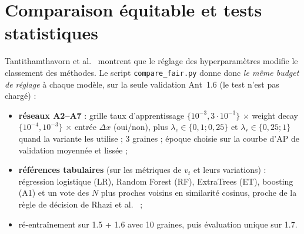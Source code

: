 \documentclass[11pt,a4paper,openany]{report}
\newcommand{\code}[1]{\texttt{\small #1}}
\begin{document}
\section{Comparaison équitable et tests statistiques}
\label{sec:fair}
Tantithamthavorn et al.~\cite{tantithamthavorn2016} montrent que le réglage des hyperparamètres modifie le classement
des méthodes. Le script \code{compare\_fair.py} donne donc \emph{le même budget de réglage} à chaque modèle, sur la
seule validation Ant~1.6 (le test n'est pas chargé) :
\begin{itemize}
  \item \textbf{réseaux A2--A7} : grille taux d'apprentissage $\{10^{-3},3\cdot10^{-3}\}$ $\times$ weight decay
        $\{10^{-4},10^{-3}\}$ $\times$ entrée $\Delta x$ (oui/non), plus $\lambda_c\in\{0{,}1;0{,}25\}$ et
        $\lambda_r\in\{0{,}25;1\}$ quand la variante les utilise ; 3 graines ; époque choisie sur la courbe d'AP de
        validation moyennée et lissée ;
  \item \textbf{références tabulaires} (sur les métriques de $v_t$ et leurs variations) : régression logistique (LR),
        Random Forest (RF), ExtraTrees (ET), boosting (A1) et un vote des $N$ plus proches voisins en similarité cosinus,
        proche de la règle de décision de Rhazi et al.~\cite{rhazi2026} ;
  \item ré-entraînement sur 1.5 + 1.6 avec 10 graines, puis évaluation unique sur 1.7.
\end{itemize}
\end{document}
